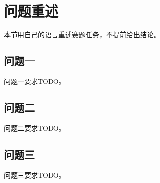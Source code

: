 \section{问题重述}

本节用自己的语言重述赛题任务，不提前给出结论。

\subsection{问题一}

问题一要求TODO。

\subsection{问题二}

问题二要求TODO。

\subsection{问题三}

问题三要求TODO。
